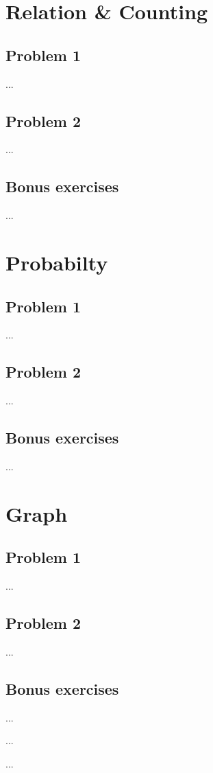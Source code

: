 \documentclass[a4paper]{article}
\begin{document}
\section{Relation \& Counting}
	\subsection{Problem 1}
	...
	
	\subsection{Problem 2}
	...

	\subsection{Bonus exercises}
	...

\section{Probabilty}
	\subsection{Problem 1}
	...
	
	\subsection{Problem 2}
	...

	\subsection{Bonus exercises}
	...



\section{Graph}
	\subsection{Problem 1}
	...
	
	\subsection{Problem 2}
	...

	\subsection{Bonus exercises}
	...

\begin{thebibliography}{80}


...


...


\end{thebibliography}
\end{document}

